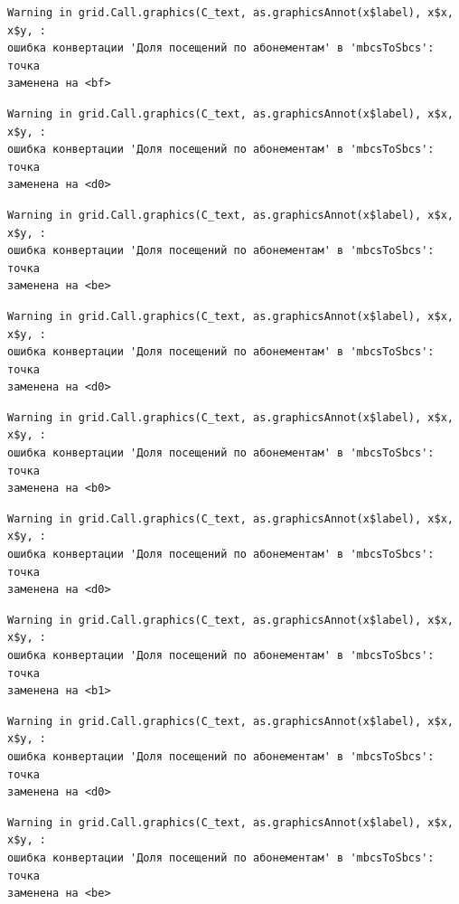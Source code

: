 \documentclass[
  letterpaper,
  DIV=11,
  numbers=noendperiod]{scrreprt}
\begin{document}
\begin{verbatim}
Warning in grid.Call.graphics(C_text, as.graphicsAnnot(x$label), x$x, x$y, :
ошибка конвертации 'Доля посещений по абонементам' в 'mbcsToSbcs': точка
заменена на <bf>
\end{verbatim}

\begin{verbatim}
Warning in grid.Call.graphics(C_text, as.graphicsAnnot(x$label), x$x, x$y, :
ошибка конвертации 'Доля посещений по абонементам' в 'mbcsToSbcs': точка
заменена на <d0>
\end{verbatim}

\begin{verbatim}
Warning in grid.Call.graphics(C_text, as.graphicsAnnot(x$label), x$x, x$y, :
ошибка конвертации 'Доля посещений по абонементам' в 'mbcsToSbcs': точка
заменена на <be>
\end{verbatim}

\begin{verbatim}
Warning in grid.Call.graphics(C_text, as.graphicsAnnot(x$label), x$x, x$y, :
ошибка конвертации 'Доля посещений по абонементам' в 'mbcsToSbcs': точка
заменена на <d0>
\end{verbatim}

\begin{verbatim}
Warning in grid.Call.graphics(C_text, as.graphicsAnnot(x$label), x$x, x$y, :
ошибка конвертации 'Доля посещений по абонементам' в 'mbcsToSbcs': точка
заменена на <b0>
\end{verbatim}

\begin{verbatim}
Warning in grid.Call.graphics(C_text, as.graphicsAnnot(x$label), x$x, x$y, :
ошибка конвертации 'Доля посещений по абонементам' в 'mbcsToSbcs': точка
заменена на <d0>
\end{verbatim}

\begin{verbatim}
Warning in grid.Call.graphics(C_text, as.graphicsAnnot(x$label), x$x, x$y, :
ошибка конвертации 'Доля посещений по абонементам' в 'mbcsToSbcs': точка
заменена на <b1>
\end{verbatim}

\begin{verbatim}
Warning in grid.Call.graphics(C_text, as.graphicsAnnot(x$label), x$x, x$y, :
ошибка конвертации 'Доля посещений по абонементам' в 'mbcsToSbcs': точка
заменена на <d0>
\end{verbatim}

\begin{verbatim}
Warning in grid.Call.graphics(C_text, as.graphicsAnnot(x$label), x$x, x$y, :
ошибка конвертации 'Доля посещений по абонементам' в 'mbcsToSbcs': точка
заменена на <be>
\end{verbatim}
\end{document}

